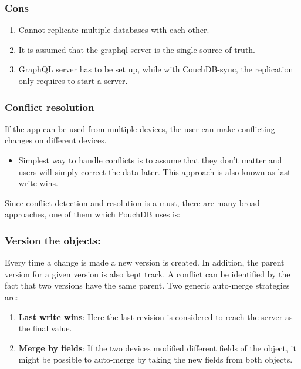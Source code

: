 \subsubsection*{Cons}
\begin{enumerate}
    \item Cannot replicate multiple databases with each other.
    \item It is assumed that the graphql-server is the single source of truth.
    \item GraphQL server has to be set up, while with CouchDB-sync, the replication 
    only requires to start a server.~\cite{RxDBreplication}
\end{enumerate}


\subsubsection{Conflict resolution}
If the app can be used from multiple devices, the user can make 
conflicting changes on different devices.

\begin{itemize}
    \item Simplest way to handle conflicts is to assume that they don’t matter and users will simply correct the data later. This approach is also known as last-write-wins.
\end{itemize}

Since conflict detection and resolution is a must, there are many broad approaches, 
one of them which PouchDB uses is:

\subsubsection*{Version the objects:}

Every time a change is made a new version is created. In addition, the parent version for a given version is also kept track. A conflict can be identified by the fact that two versions have the same parent. Two generic auto-merge strategies are:

\begin{enumerate}
    \item \textbf{Last write wins}: Here the last revision is considered to reach the server as the final value.
    \item \textbf{Merge by fields}: If the two devices modified different fields of the object, it might be possible to auto-merge by taking the new fields from both objects.
\end{enumerate}

